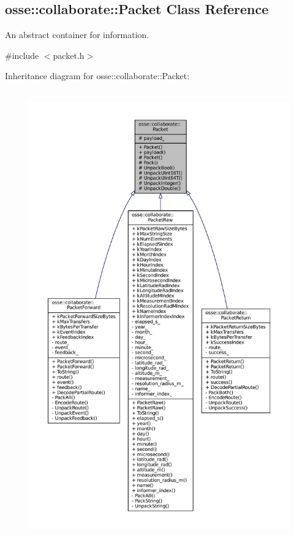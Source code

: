 \hypertarget{classosse_1_1collaborate_1_1_packet}{}\subsection{osse\+:\+:collaborate\+:\+:Packet Class Reference}
\label{classosse_1_1collaborate_1_1_packet}


An abstract container for information.  




{\ttfamily \#include $<$packet.\+h$>$}



Inheritance diagram for osse\+:\+:collaborate\+:\+:Packet\+:
\nopagebreak
\begin{figure}[H]
\begin{center}
\leavevmode
\includegraphics[height=550pt]{classosse_1_1collaborate_1_1_packet__inherit__graph}
\end{center}
\end{figure}
